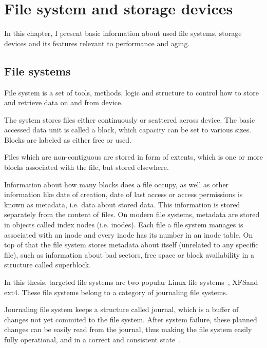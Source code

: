 \documentclass[
  color, %
  table, %
  lof,   %
  lot,   %
]{fithesis3}
\begin{document}

\chapter{File system and storage devices}
\label{fs}
In this chapter, I present basic information about used file systems, storage devices and its features relevant to performance and aging.

\section{File systems}
File system is a set of tools, methods, logic and structure to control how to store and retrieve data on and from device.

The system stores files either continuously or scattered across device. The basic accessed data unit is called a block, which capacity can be set to various sizes. Blocks are labeled as either free or used.

Files which are non-contiguous are stored in form of extents, which is one or more blocks associated with the file, but stored elsewhere.  

Information about how many blocks does a file occupy, as well as other information like date of creation, date of last access or access permissions is known as metadata, i.e. data about stored data. This information is stored separately from the content of files. On modern file systems, metadata are stored in objects called index nodes (i.e. inodes). Each file a file system manages is associated with an inode and every inode has its number in an inode table. On top of that the file system stores metadata about itself (unrelated to any specific file), such as information about bad sectors, free space or block availability in a structure called superblock.

In this thesis, targeted file systems are two popular Linux file systems~\cite{Lu:2013:SLF:2591272.2591276}, XFS\footnotemark[1] and ext4\footnotemark[2]. These file systems belong to a category of journaling file systems.

Journaling file system keeps a structure called journal, which is a buffer of changes not yet commited to the file system. After system failure, these planned changes can be easily read from the journal, thus making the file system easily fully operational, and in a correct and consistent state~\cite{prabhakaran2005analysis}.
\end{document}
